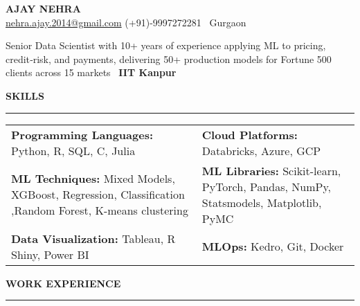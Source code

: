 \documentclass[a4paper,10pt]{article}
\begin{document}
\begin{center}
    \textbf{\LARGE \MakeUppercase{Ajay Nehra}} \\
    \vspace{1mm}
    \href{mailto:nehra.ajay.2014@gmail.com}{nehra.ajay.2014@gmail.com} \hspace{5mm}
    \href{https://www.linkedin.com/in/ajay-n-575bba23/}{\faLinkedin} \hspace{5mm}
    (+91)-9997272281 \hspace{5mm}
    \faMapMarker \, Gurgaon
\end{center}

\vspace{1mm}

{\large
Senior Data Scientist with 10+ years of experience applying ML to pricing, credit‑risk, and payments, delivering 50+ production models for Fortune 500 clients across 15 markets \textbar\ \textbf{IIT Kanpur}
}

\vspace{1mm}

\begin{center}
    \textbf{\LARGE \MakeUppercase{Skills}}\\[-1.2ex]
    \noindent\rule{\textwidth}{0.8pt}
\end{center}

\noindent
\begin{tabular}{p{} p{}}
    \textbf{Programming Languages:} Python, R, SQL, C, Julia & \textbf{Cloud Platforms:} Databricks, Azure, GCP \\
    \textbf{ML Techniques:} Mixed Models, XGBoost, Regression, Classification ,Random Forest, K-means clustering & \textbf{ML Libraries:} Scikit-learn, PyTorch, Pandas, NumPy, Statsmodels, Matplotlib, PyMC\\
    \textbf{Data Visualization:} Tableau, R Shiny, Power BI & \textbf{MLOps:} Kedro, Git, Docker \\
\end{tabular}

\vspace{1mm}
\begin{center}
    \textbf{\LARGE \MakeUppercase{Work Experience}}\\[-1.2ex]
    \noindent\rule{\textwidth}{0.8pt}
\end{center}
\end{document}
